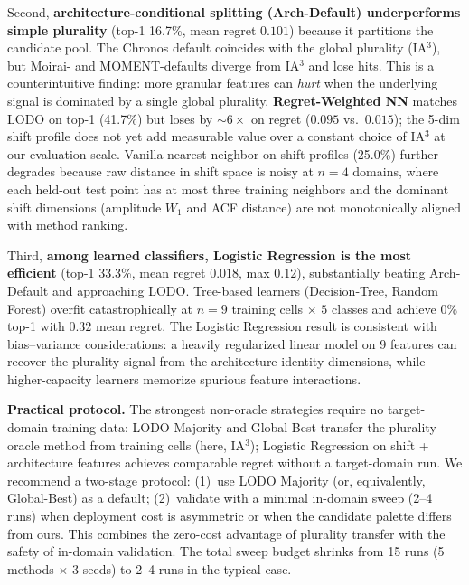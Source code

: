 \documentclass{article}
\begin{document}
Second, \textbf{architecture-conditional splitting (Arch-Default) underperforms simple plurality} (top-1 16.7\%, mean regret $0.101$) because it partitions the candidate pool. The Chronos default coincides with the global plurality (IA$^3$), but Moirai- and MOMENT-defaults diverge from IA$^3$ and lose hits. This is a counterintuitive finding: more granular features can \emph{hurt} when the underlying signal is dominated by a single global plurality. \textbf{Regret-Weighted NN} matches LODO on top-1 (41.7\%) but loses by $\sim$$6{\times}$ on regret ($0.095$ vs.\ $0.015$); the 5-dim shift profile does not yet add measurable value over a constant choice of IA$^3$ at our evaluation scale. Vanilla nearest-neighbor on shift profiles (25.0\%) further degrades because raw distance in shift space is noisy at $n{=}4$ domains, where each held-out test point has at most three training neighbors and the dominant shift dimensions (amplitude $W_1$ and ACF distance) are not monotonically aligned with method ranking.

Third, \textbf{among learned classifiers, Logistic Regression is the most efficient} (top-1 33.3\%, mean regret $0.018$, max $0.12$), substantially beating Arch-Default and approaching LODO. Tree-based learners (Decision-Tree, Random Forest) overfit catastrophically at $n{=}9$ training cells $\times$ $5$ classes and achieve $0\%$ top-1 with $0.32$ mean regret. The Logistic Regression result is consistent with bias--variance considerations: a heavily regularized linear model on 9 features can recover the plurality signal from the architecture-identity dimensions, while higher-capacity learners memorize spurious feature interactions.

\textbf{Practical protocol.} The strongest non-oracle strategies require no target-domain training data: LODO Majority and Global-Best transfer the plurality oracle method from training cells (here, IA$^3$); Logistic Regression on shift + architecture features achieves comparable regret without a target-domain run. We recommend a two-stage protocol: (1)~use LODO Majority (or, equivalently, Global-Best) as a default; (2)~validate with a minimal in-domain sweep (2--4 runs) when deployment cost is asymmetric or when the candidate palette differs from ours. This combines the zero-cost advantage of plurality transfer with the safety of in-domain validation. The total sweep budget shrinks from 15 runs (5 methods $\times$ 3 seeds) to 2--4 runs in the typical case.
\end{document}
